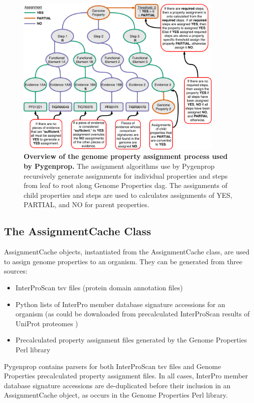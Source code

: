\begin{figure}[!ht]
  \centering
	\includegraphics[width=0.90\textwidth]{media/Pygenprop_Assignment.pdf}
	 \caption[Overview of the genome property assignment process used by Pygenprop.]{\textbf{Overview of the genome property assignment process used by Pygenprop.} The assignment algorithms use by Pygenprop recursively generate assignments for individual properties and steps from leaf to root along Genome Properties \gls{dag}. The assignments of child properties and steps are used to calculates assignments of YES, PARTIAL, and NO for parent properties.}
	 \label{fig:propertyassignment}
\end{figure}

\subsection{The AssignmentCache Class} \label{AssignmentCache}

AssignmentCache objects, instantiated from the AssignmentCache class, are used to assign genome properties to an organism. They can be generated from three sources: 
\begin{itemize}
\item InterProScan \gls{tsv} files (protein domain annotation files) 
\item Python lists of InterPro member database signature accessions for an organism (as could be downloaded from precalculated InterProScan results of UniProt proteomes \cite{uniprot2014uniprot})
\item Precalculated property assignment files generated by the Genome Properties Perl library
\end{itemize}
Pygenprop contains parsers for both InterProScan \gls{tsv} files and Genome Properties precalculated property assignment files. In all cases, InterPro member database signature accessions are de-duplicated before their inclusion in an AssignmentCache object, as occurs in the Genome Properties Perl library.

